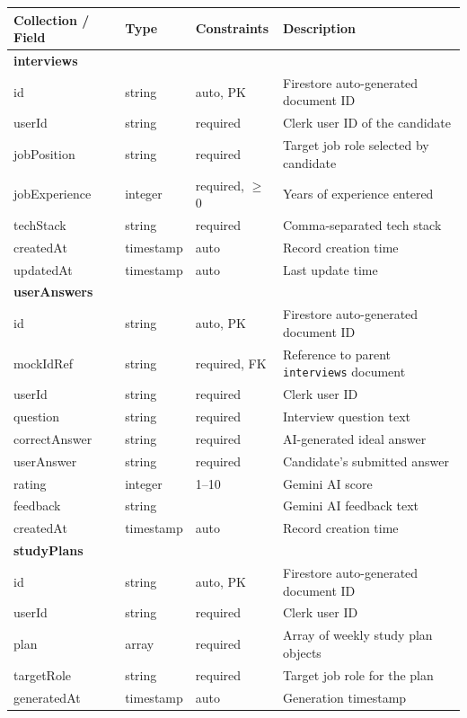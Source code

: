 \documentclass{fisatinternship}
\begin{document}
\begin{longtable}{|p{3.2cm}|p{2cm}|p{2cm}|p{4cm}|}
\hline
\textbf{Collection / Field} & \textbf{Type} & \textbf{Constraints} & \textbf{Description} \\
\hline
\endhead

\multicolumn{4}{|l|}{\textbf{interviews}} \\
\hline
id & string & auto, PK & Firestore auto-generated document ID \\
\hline
userId & string & required & Clerk user ID of the candidate \\
\hline
jobPosition & string & required & Target job role selected by candidate \\
\hline
jobExperience & integer & required, $\geq$0 & Years of experience entered \\
\hline
techStack & string & required & Comma-separated tech stack \\
\hline
createdAt & timestamp & auto & Record creation time \\
\hline
updatedAt & timestamp & auto & Last update time \\
\hline

\multicolumn{4}{|l|}{\textbf{userAnswers}} \\
\hline
id & string & auto, PK & Firestore auto-generated document ID \\
\hline
mockIdRef & string & required, FK & Reference to parent \texttt{interviews} document \\
\hline
userId & string & required & Clerk user ID \\
\hline
question & string & required & Interview question text \\
\hline
correctAnswer & string & required & AI-generated ideal answer \\
\hline
userAnswer & string & required & Candidate's submitted answer \\
\hline
rating & integer & 1--10 & Gemini AI score \\
\hline
feedback & string & & Gemini AI feedback text \\
\hline
createdAt & timestamp & auto & Record creation time \\
\hline

\multicolumn{4}{|l|}{\textbf{studyPlans}} \\
\hline
id & string & auto, PK & Firestore auto-generated document ID \\
\hline
userId & string & required & Clerk user ID \\
\hline
plan & array & required & Array of weekly study plan objects \\
\hline
targetRole & string & required & Target job role for the plan \\
\hline
generatedAt & timestamp & auto & Generation timestamp \\
\hline


\end{longtable}
\end{document}
